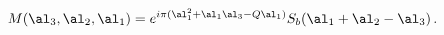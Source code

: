 \begin{equation}
M(\al_3,\al_2,\al_1)=e^{i\pi
(\al_{1}^2+\al_1\al_3-Q\al_1)}S_b(\al_1+\al_2-\al_{3})\, .\label{M}
\end{equation}

